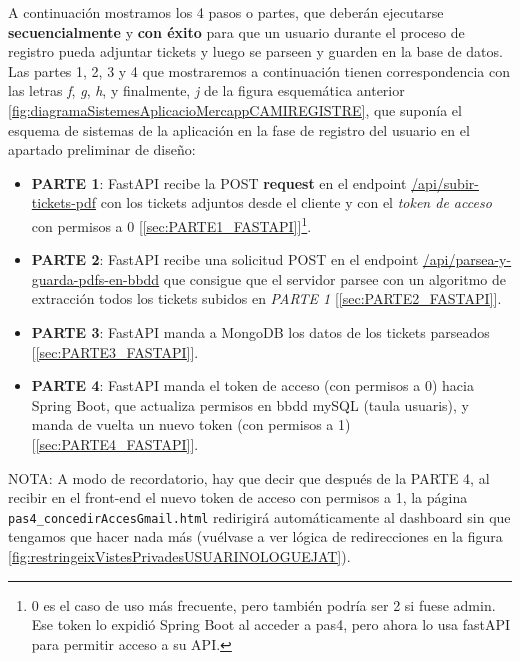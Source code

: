 \documentclass[a4paper,12pt]{report}
\begin{document}
	A continuación mostramos los 4 pasos o partes, que deberán ejecutarse \textbf{secuencialmente} y \textbf{con éxito} para que un usuario durante el proceso de registro pueda adjuntar tickets y luego se parseen y guarden en la base de datos. Las partes 1, 2, 3 y 4 que mostraremos a continuación tienen correspondencia con las letras \textit{f}, \textit{g}, \textit{h}, y finalmente, \textit{j} de la figura esquemática anterior \ref{fig:diagramaSistemesAplicacioMercappCAMIREGISTRE}, que suponía el esquema de sistemas de la aplicación en la fase de registro del usuario en el apartado preliminar de diseño:
	
	\begin{itemize}
	\setlength{\itemsep}{-.3em}
		\item \textbf{PARTE 1}: FastAPI recibe la POST \textbf{request} en el endpoint \href{https://github.com/blackcub3s/mercApp/blob/1394c4a58c59d41e1b64f1113007277676fe4cf8/APP%20WEB/__FastAPI__/app/controlador.py#L37}{/api/subir-tickets-pdf} con los tickets adjuntos desde el cliente y con el \textit{token de acceso} con permisos a 0 [\ref{sec:PARTE1_FASTAPI}]\footnote{0 es el caso de uso más frecuente, pero también podría ser 2 si fuese admin. Ese token lo expidió Spring Boot al acceder a pas4, pero ahora lo usa fastAPI para permitir acceso a su API.}.
		\item \textbf{PARTE 2}: FastAPI recibe una solicitud POST en el endpoint \href{https://github.com/blackcub3s/mercApp/blob/8f9e4de79e8f384a9da6e0c43222135d5d8e3bd2/APP%20WEB/__FastAPI__/app/controlador.py#L116}{/api/parsea-y-guarda-pdfs-en-bbdd} que consigue que el servidor parsee con un algoritmo de extracción todos los tickets subidos en \textit{PARTE 1} [\ref{sec:PARTE2_FASTAPI}].
		\item \textbf{PARTE 3}: FastAPI manda a MongoDB los datos de los tickets parseados [\ref{sec:PARTE3_FASTAPI}].
		\item \textbf{PARTE 4}: FastAPI manda el token de acceso (con permisos a 0) hacia Spring Boot, que actualiza permisos en bbdd mySQL (taula usuaris), y manda de vuelta un nuevo token (con permisos a 1) [\ref{sec:PARTE4_FASTAPI}].
	\end{itemize}

	
	NOTA: A modo de recordatorio, hay que decir que después de la PARTE 4, al recibir en el front-end el nuevo token de acceso con permisos a 1, la página \texttt{pas4\_concedirAccesGmail.html} redirigirá automáticamente al dashboard sin que tengamos que hacer nada más (vuélvase a ver lógica de redirecciones en la figura \ref{fig:restringeixVistesPrivadesUSUARINOLOGUEJAT}).
	
\end{document}
